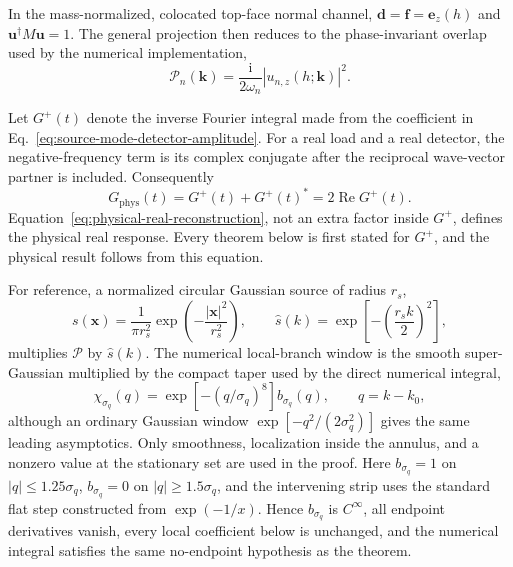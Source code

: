 In the mass-normalized, colocated top-face normal channel,
\(\mathbf d=\mathbf f=\mathbf e_z(h)\) and
\(\mathbf u^\dagger M\mathbf u=1\).  The general projection then reduces to
the phase-invariant overlap used by the numerical implementation,
\begin{equation}
  \mathcal P_n(\mathbf k)
  =\frac{\mathrm i}{2\omega_n}
    \left|u_{n,z}(h;\mathbf k)\right|^2.
  \label{eq:normal-impulse-overlap}
\end{equation}

Let \(G^{+}(t)\) denote the inverse Fourier integral made from the coefficient
in Eq.~\eqref{eq:source-mode-detector-amplitude}.  For a real load and
a real detector, the negative-frequency term is its complex conjugate after
the reciprocal wave-vector partner is included.  Consequently
\begin{equation}
  G_{\mathrm{phys}}(t)
  =G^{+}(t)+G^{+}(t)^*
  =2\operatorname{Re}G^{+}(t).
  \label{eq:physical-real-reconstruction}
\end{equation}
Equation~\eqref{eq:physical-real-reconstruction}, not an extra factor inside
\(G^{+}\), defines the physical real response.  Every theorem below is first
stated for \(G^{+}\), and the physical result follows from this equation.

For reference, a normalized circular Gaussian source of radius \(r_s\),
\begin{equation}
  s(\mathbf x)=\frac{1}{\pi r_s^2}
    \exp\left(-\frac{|\mathbf x|^2}{r_s^2}\right),
  \qquad
  \widehat s(k)=\exp\left[-\left(\frac{r_sk}{2}\right)^2\right],
  \label{eq:gaussian-source-transform}
\end{equation}
multiplies \(\mathcal P\) by \(\widehat s(k)\).  The numerical local-branch
window is the smooth super-Gaussian multiplied by the compact taper used by
the direct numerical integral,
\begin{equation}
  \chi_{\sigma_q}(q)=\exp[-(q/\sigma_q)^8]b_{\sigma_q}(q),
  \qquad q=k-k_0,
  \label{eq:green-super-gaussian-window}
\end{equation}
although an ordinary Gaussian window
\(\exp[-q^2/(2\sigma_q^2)]\) gives the same leading asymptotics.  Only
smoothness, localization inside the annulus, and a nonzero value at the
stationary set are used in the proof.  Here \(b_{\sigma_q}=1\) on
\(|q|\leq1.25\sigma_q\), \(b_{\sigma_q}=0\) on
\(|q|\geq1.5\sigma_q\), and the intervening strip uses the standard flat
step constructed from \(\exp(-1/x)\).  Hence \(b_{\sigma_q}\) is
\(C^\infty\), all endpoint derivatives vanish, every local coefficient below
is unchanged, and the numerical integral satisfies the same no-endpoint
hypothesis as the theorem.

